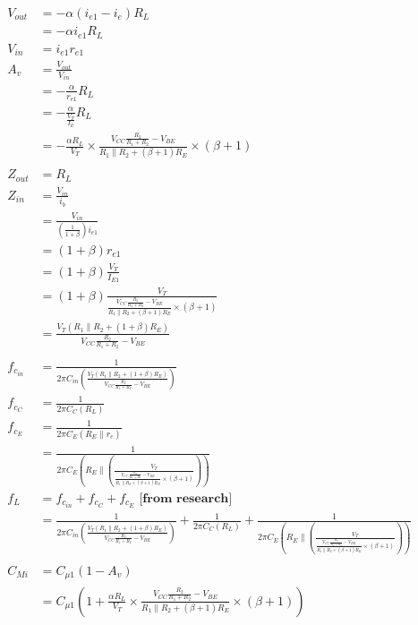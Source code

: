 \documentclass[11pt, a4paper]{article}
\begin{document}
\begin{align*}
    V_{out} &= -\alpha(i_{e1}-i_e)R_L\\
    &= -\alpha i_{e1}R_L\\
    V_{in} &= i_{e1} r_{e1}\\
    A_v &= \frac{V_{out}}{V_{in}}\\
    &= -\frac{\alpha}{r_{e1}}R_L\\
    &= -\frac{\alpha}{\frac{V_T}{I_E}}R_L\\
    &= -\frac{\alpha R_L}{V_T} \times \frac{V_{CC}\frac{R_2}{R_1+R_2}-V_{BE}}{R_1 \parallel R_2 + (\beta+1)R_E} \times (\beta + 1)\\ \\
    Z_{out} &= R_L\\
    Z_{in} &= \frac{V_{in}}{i_b}\\
    &= \frac{V_{in}}{(\frac{1}{1+\beta})i_{e1}}\\
    &= (1+\beta)r_{e1}\\
    &= (1+\beta)\frac{V_T}{I_{E1}}\\
    &= (1+\beta)\frac{V_T}{\frac{V_{CC}\frac{R_2}{R_1+R_2}-V_{BE}}{R_1 \parallel R_2 + (\beta+1)R_E} \times (\beta + 1)}\\
    &= \frac{V_T (R_1 \parallel R_2 + (1+\beta)R_E)}{V_{CC}\frac{R_2}{R_1+R_2}-V_{BE}}\\ \\
f_{c_{in}} &= \frac{1}{2\pi C_{in} (\frac{V_T (R_1 \parallel R_2 + (1+\beta)R_E)}{V_{CC}\frac{R_2}{R_1+R_2}-V_{BE}})}\\
f_{c_C} &= \frac{1}{2\pi C_C (R_L)}\\
f_{c_E} &= \frac{1}{2\pi C_E (R_E \parallel r_e)} \\
&= \frac{1}{2\pi C_E (R_E \parallel (\frac{V_T}{\frac{V_{CC}\frac{R_2}{R_1+R_2}-V_{BE}}{R_1 \parallel R_2 + (\beta+1)R_E} \times (\beta + 1)}))} \\
f_L &= f_{c_{in}} + f_{c_C} + f_{c_E} \textbf{ [from research]}\\
&= \frac{1}{2\pi C_{in} (\frac{V_T (R_1 \parallel R_2 + (1+\beta)R_E)}{V_{CC}\frac{R_2}{R_1+R_2}-V_{BE}})} + \frac{1}{2\pi C_C (R_L)} + \frac{1}{2\pi C_E (R_E \parallel (\frac{V_T}{\frac{V_{CC}\frac{R_2}{R_1+R_2}-V_{BE}}{R_1 \parallel R_2 + (\beta+1)R_E} \times (\beta + 1)}))}\\ \\
C_{Mi} &= C_{\mu1} (1 - A_v)\\
&= C_{\mu1} \left(1 + \frac{\alpha R_L}{V_T} \times \frac{V_{CC}\frac{R_2}{R_1+R_2}-V_{BE}}{R_1 \parallel R_2 + (\beta+1)R_E} \times (\beta + 1) \right)\\

\end{align*}
\end{document}
